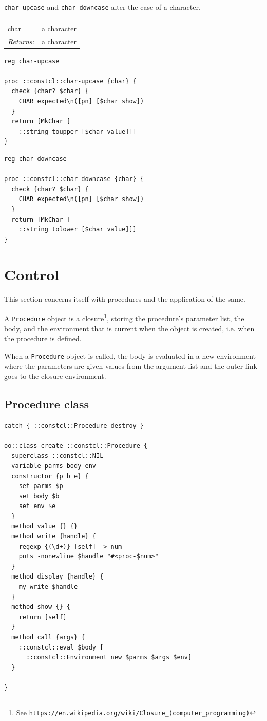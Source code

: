 \documentclass[twoside,9pt]{report}
\begin{document}
\texttt{char-upcase} and \texttt{char-downcase} alter the case of a character.

\noindent\begin{tabular}{ |p{1.5cm} p{8cm}| }
\hline
\rowcolor[HTML]{CCCCCC} \multicolumn{2}{|l|}{\bf char-upcase, char-downcase (public)} \\
char & a character \\
\textit{Returns:} & a character \\
\hline
\end{tabular}
\begin{lstlisting}
reg char-upcase
 
proc ::constcl::char-upcase {char} {
  check {char? $char} {
    CHAR expected\n([pn] [$char show])
  }
  return [MkChar [
    ::string toupper [$char value]]]
}
\end{lstlisting}
\begin{lstlisting}
reg char-downcase
 
proc ::constcl::char-downcase {char} {
  check {char? $char} {
    CHAR expected\n([pn] [$char show])
  }
  return [MkChar [
    ::string tolower [$char value]]]
}
\end{lstlisting}
\section{Control}
\label{control}


This section concerns itself with procedures and the application of the same.


A \texttt{Procedure} object is a closure\footnote{See \texttt{https://en.wikipedia.org/wiki/Closure\_(computer\_programming)}}, storing the procedure's parameter list, the body, and the environment that is current when the object is created, i.e. when the procedure is defined.


When a \texttt{Procedure} object is called, the body is evaluated in a new environment where the parameters are given values from the argument list and the outer link goes to the closure environment.

\subsection{Procedure class}
\label{procedure-class}
\begin{lstlisting}
catch { ::constcl::Procedure destroy }
 
oo::class create ::constcl::Procedure {
  superclass ::constcl::NIL
  variable parms body env
  constructor {p b e} {
    set parms $p
    set body $b
    set env $e
  }
  method value {} {}
  method write {handle} {
    regexp {(\d+)} [self] -> num
    puts -nonewline $handle "#<proc-$num>"
  }
  method display {handle} {
    my write $handle
  }
  method show {} {
    return [self]
  }
  method call {args} {
    ::constcl::eval $body [
      ::constcl::Environment new $parms $args $env]
  }
 
}
\end{lstlisting}
\end{document}
